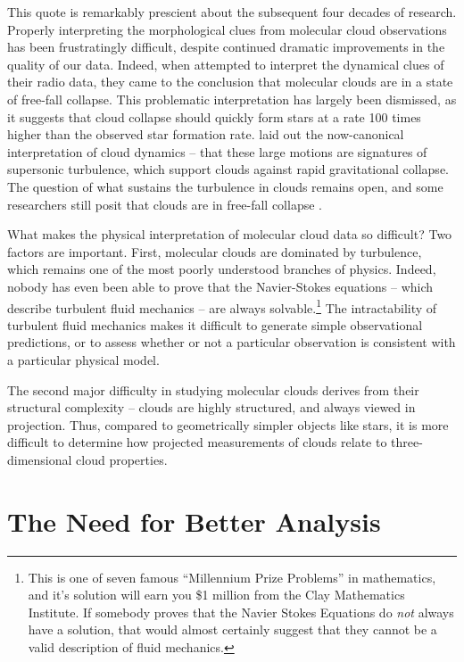 This quote is remarkably prescient about the subsequent four decades of research. Properly interpreting the morphological clues from molecular cloud observations has been frustratingly difficult, despite continued dramatic improvements in the quality of our data. Indeed, when \cite{Goldreich74} attempted to interpret the dynamical clues of their radio data, they came to the conclusion that molecular clouds are in a state of free-fall collapse. This problematic interpretation has largely been dismissed, as it suggests that cloud collapse should quickly form stars at a rate 100 times higher than the observed star formation rate. \cite{Larson81} laid out the now-canonical interpretation of cloud dynamics -- that these large motions are signatures of supersonic turbulence, which support clouds against rapid gravitational collapse. The question of what sustains the turbulence in clouds remains open, and some researchers still posit that clouds are in free-fall collapse \citep{Vaz07}.

What makes the physical interpretation of molecular cloud data so difficult? Two factors are important. First, molecular clouds are dominated by turbulence, which remains one of the most poorly understood branches of physics. Indeed, nobody has even been able to prove that the Navier-Stokes equations -- which describe turbulent fluid mechanics -- are always solvable.\footnote{This is one of seven famous ``Millennium Prize Problems'' in mathematics, and it's solution will earn you \$1 million from the Clay Mathematics Institute. If somebody proves that the Navier Stokes Equations do \emph{not} always have a solution, that would almost certainly suggest that they cannot be a valid description of fluid mechanics.} The intractability of turbulent fluid mechanics makes it difficult to generate simple observational predictions, or to assess whether or not a particular observation is consistent with a particular physical model. 

The second major difficulty in studying molecular clouds derives from their structural complexity -- clouds are highly structured, and always viewed in projection. Thus, compared to geometrically simpler objects like stars, it is more difficult to determine how projected measurements of clouds relate to three-dimensional cloud properties.

\section{The Need for Better Analysis}

